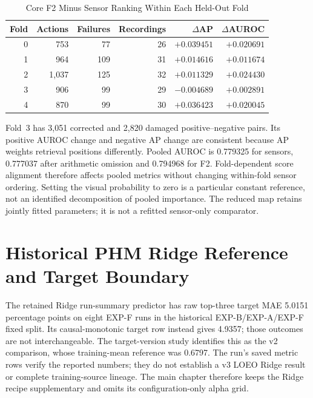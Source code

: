 \begin{table}[htbp]
\caption{Core F2 Minus Sensor Ranking Within Each Held-Out Fold}\label{tab:f2-fold-audit}
\centering\small
\begin{tabular}{rrrrrr}\toprule
Fold & Actions & Failures & Recordings & $\Delta$AP & $\Delta$AUROC\\\midrule
0 & 753 & 77 & 26 & $+0.039451$ & $+0.020691$\\
1 & 964 & 109 & 31 & $+0.014616$ & $+0.011674$\\
2 & 1,037 & 125 & 32 & $+0.011329$ & $+0.024430$\\
3 & 906 & 99 & 29 & $-0.004689$ & $+0.002891$\\
4 & 870 & 99 & 30 & $+0.036423$ & $+0.020045$\\\bottomrule
\end{tabular}
\end{table}
Fold~3 has 3,051 corrected and 2,820 damaged positive--negative pairs. Its positive
AUROC change and negative AP change are consistent because AP weights retrieval
positions differently. Pooled AUROC is 0.779325 for sensors, 0.777037 after arithmetic
omission and 0.794968 for F2. Fold-dependent score alignment therefore affects pooled
metrics without changing within-fold sensor ordering. Setting the visual probability to
zero is a particular constant reference, not an identified decomposition of pooled
importance. The reduced map retains jointly fitted parameters; it is not a refitted
sensor-only comparator.

\section{Historical PHM Ridge Reference and Target Boundary}
\label{sec:phm-ridge-supplement}
The retained Ridge run-summary predictor has raw top-three target MAE 5.0151 percentage
points on eight EXP-F runs in the historical EXP-B/EXP-A/EXP-F fixed split. Its
causal-monotonic target row instead gives 4.9357; those outcomes are not interchangeable.
The target-version study identifies this as the v2 comparison, whose training-mean
reference was 0.6797. The run's saved metric rows verify the reported numbers; they do
not establish a v3 LOEO Ridge result or complete training-source lineage. The main
chapter therefore keeps the Ridge recipe supplementary and omits its configuration-only
alpha grid.

